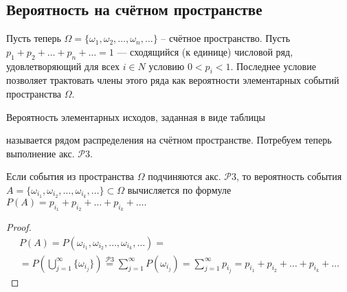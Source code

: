 \subsection{Вероятность на счётном пространстве}
Пусть теперь $\Omega = \{\omega_1 , \omega_2 , \ldots , \omega_n , \ldots \}$ – счётное пространство. Пусть $p_1 + p_2 + \ldots + p_n + \ldots = 1$ — сходящийся (к единице) числовой ряд, удовлетворяющий
для всех $i \in N$ условию $0 < p_i < 1$. Последнее условие позволяет трактовать члены этого ряда как вероятности элементарных событий пространства $\Omega$.

\begin{definition}
	Вероятность элементарных исходов, заданная в виде таблицы


\begin{table}
\end{table}

называется рядом распределения на счётном пространстве.
Потребуем теперь выполнение акс. $\mathcal{P}3$.
\end{definition}

\begin{lemma}

Если события из пространства $\Omega$ подчиняются акс. $\mathcal{P}3$, то вероятность события $A = \{\omega_{i_1} , \omega_{i_2} , \ldots , \omega_{i_k} , \ldots \} \subset \Omega$ вычисляется по формуле
$P (A) = p_{i_1} + p_{i_2} + \ldots + p_{i_k} + \ldots .$
\end{lemma}

\begin{proof}
\begin{gather*}
	P(A) = P(\omega_{i_1},\omega_{i_2}, \ldots, \omega_{i_k}, \ldots) =\\= P \left( \bigcup_{j=1}^\infty \{ \omega_{i_j}\} \right) \stackrel{\mathcal{P}3}{=} \sum_{j=1}^{\infty} P(\omega_{i_j}) = \sum_{j=1}^{\infty} p_{i_j} = p_{i_1} + p_{i_2} + \ldots + p_{i_k} + \ldots 
\end{gather*}
	
\end{proof}

